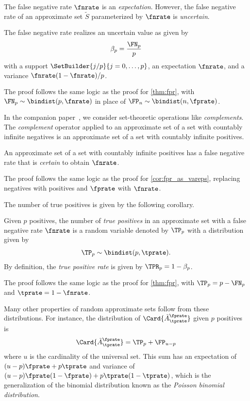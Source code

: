 The false negative rate $\fnrate$ is an \emph{expectation}.
However, the false negative rate of an approximate set $\tilde{S}$ parameterized by $\fnrate$ is \emph{uncertain}.
\begin{theorem}
\label{thm:fnr}
The false negative rate realizes an uncertain value as given by
\begin{equation}
    \beta_p = \frac{\FN_p}{p}
\end{equation}
with a support $\SetBuilder{j / p}{j = 0,\ldots,p}$, an expectation
$\fnrate$, and a variance $\fnrate(1-\fnrate) / p$.
\end{theorem}
The proof follows the same logic as the proof for \cref{thm:fpr}, with $\FN_p \sim \bindist(p, \fnrate)$ in place of $\FP_n \sim \bindist(n, \fprate)$.

In the companion paper~\cite{bernoulliComposition}, we consider set-theoretic
operations like \emph{complements}. The \emph{complement} operator applied to an
approximate set of a set with countably infinite negatives is an approximate set
of a set with countably infinite positives.
\begin{corollary}
An approximate set of a set with countably infinite positives has a false
negative rate that is \emph{certain} to obtain $\fnrate$.
\end{corollary}
The proof follows the same logic as the proof for \cref{cor:fpr_as_vareps}, replacing negatives with positives and $\fprate$ with $\fnrate$.

The number of true positives is given by the following corollary.
\begin{corollary}
\label{cor:tpbinom}
Given $p$ positives, the number of \emph{true positives} in an approximate set
with a false negative rate $\fnrate$ is a random variable denoted by $\TP_p$
with a distribution given by
\begin{equation}
    \TP_p \sim \bindist(p, \tprate).
\end{equation}
By definition, the \emph{true positive rate} is given by $\TPR_p = 1 -
\beta_p$.
\end{corollary}
The proof follows the same logic as the proof for \cref{thm:fpr}, with $\TP_p = p - \FN_p$ and $\tprate = 1 - \fnrate$.

Many other properties of random approximate sets follow from these distributions.
For instance, the distribution of $\Card{\tilde{A}^\fprate_\tprate}$ given $p$ positives is
\begin{equation}
	\Card{\tilde{A}^\fprate_\tprate} = \TP_p + \FP_{u - p}
\end{equation}
where $u$ is the cardinality of the universal set. This sum has an expectation of $(u - p) \fprate + p \tprate$ and variance of $(u - p) \fprate(1-\fprate) + p \tprate(1-\tprate)$, which is the generalization of the binomial distribution known as the \emph{Poisson binomial distribution}.

